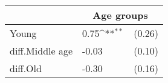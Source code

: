{
\def\sym#1{\ifmmode^{#1}\else\(^{#1}\)\fi}
\begin{tabular*}{.5\hsize}{@{\hskip\tabcolsep\extracolsep\fill}l*{1}{lc}}
\toprule
                &\multicolumn{2}{c}{Age groups}\\
\midrule
Young           &     0.75\sym{**} &   (0.26)\\
diff.Middle age &    -0.03         &   (0.10)\\
diff.Old        &    -0.30         &   (0.16)\\
\bottomrule
\end{tabular*}
}
